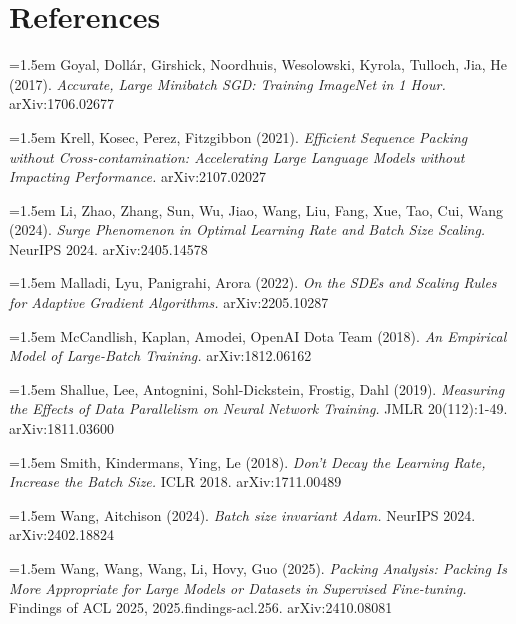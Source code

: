 \documentclass[11pt]{article}
\begin{document}
\section*{References}
\begingroup
\small
\setlength{\parindent}{0pt}

\hangindent=1.5em Goyal, Doll\'ar, Girshick, Noordhuis, Wesolowski, Kyrola, Tulloch, Jia, He (2017). \emph{Accurate, Large Minibatch SGD: Training ImageNet in 1 Hour.} arXiv:1706.02677\par

\hangindent=1.5em Krell, Kosec, Perez, Fitzgibbon (2021). \emph{Efficient Sequence Packing without Cross-contamination: Accelerating Large Language Models without Impacting Performance.} arXiv:2107.02027\par

\hangindent=1.5em Li, Zhao, Zhang, Sun, Wu, Jiao, Wang, Liu, Fang, Xue, Tao, Cui, Wang (2024). \emph{Surge Phenomenon in Optimal Learning Rate and Batch Size Scaling.} NeurIPS 2024. arXiv:2405.14578\par

\hangindent=1.5em Malladi, Lyu, Panigrahi, Arora (2022). \emph{On the SDEs and Scaling Rules for Adaptive Gradient Algorithms.} arXiv:2205.10287\par

\hangindent=1.5em McCandlish, Kaplan, Amodei, OpenAI Dota Team (2018). \emph{An Empirical Model of Large-Batch Training.} arXiv:1812.06162\par

\hangindent=1.5em Shallue, Lee, Antognini, Sohl-Dickstein, Frostig, Dahl (2019). \emph{Measuring the Effects of Data Parallelism on Neural Network Training.} JMLR 20(112):1-49. arXiv:1811.03600\par

\hangindent=1.5em Smith, Kindermans, Ying, Le (2018). \emph{Don't Decay the Learning Rate, Increase the Batch Size.} ICLR 2018. arXiv:1711.00489\par

\hangindent=1.5em Wang, Aitchison (2024). \emph{Batch size invariant Adam.} NeurIPS 2024. arXiv:2402.18824\par

\hangindent=1.5em Wang, Wang, Wang, Li, Hovy, Guo (2025). \emph{Packing Analysis: Packing Is More Appropriate for Large Models or Datasets in Supervised Fine-tuning.} Findings of ACL 2025, 2025.findings-acl.256. arXiv:2410.08081\par
\end{document}
